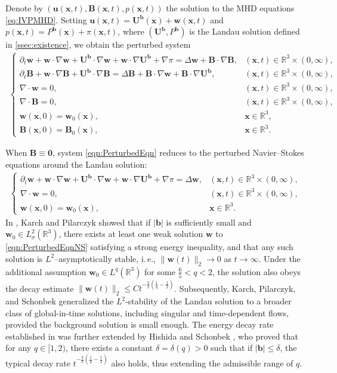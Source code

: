 \documentclass[10pt]{amsart}
\theoremstyle{plain}
\theoremstyle{definition}
\theoremstyle{remark}
\numberwithin{equation}{section}
\newcommand{\pt}{\partial_t}
\newcommand{\bx}{\boldsymbol{x}}
\newcommand{\bb}{{\boldsymbol{b}}}
\newcommand{\bu}{{\boldsymbol{u}}}
\newcommand{\bU}{{\boldsymbol{U}}}
\newcommand{\bw}{{\boldsymbol{w}}}
\newcommand{\bB}{{\boldsymbol{B}}}
\begin{document}
Denote by $(\bu(\bx,t), \bB(\bx,t), p(\bx,t))$ the solution to the MHD equations \cref{eq:IVPMHD}. Setting $\bu(\bx,t)=\bU^{\bb}(\bx)+\bw(\bx,t)$ and $p(\bx,t)=P^\bb(\bx)+\pi(\bx,t)$, where $(\bU^\bb,P^\bb)$ is the Landau solution defined in \cref{ssec:existence},  we obtain the perturbed system
\begin{align}\label{eqn:PerturbedEqn}
\begin{cases}
\pt \bw + \bw \cdot \nabla \bw + \bU^\bb\cdot \nabla\bw+\bw\cdot \nabla \bU^\bb+\nabla \pi = \Delta\bw + \bB \cdot \nabla \bB, & (\bx,t)\in \mathbb{R}^3\times(0,\infty),\\
\pt \bB+\bw \cdot \nabla \bB+ \bU^\bb \cdot \nabla \bB=\Delta \bB + \bB \cdot \nabla \bw + \bB\cdot \nabla \bU^\bb, & (\bx,t)\in \mathbb{R}^3\times(0,\infty),\\
\nabla \cdot \bw=0, & (\bx,t)\in \mathbb{R}^3\times(0,\infty),\\
\nabla \cdot \bB=0, & (\bx,t)\in \mathbb{R}^3\times(0,\infty),\\
\bw(\bx,0)=\bw_0(\bx), & \bx \in \mathbb{R}^3,\\
\bB(\bx,0)=\bB_0(\bx), & \bx \in \mathbb{R}^3.
\end{cases}
\end{align}

When $\bB \equiv \mathbf{0}$, system \cref{eqn:PerturbedEqn} reduces to the perturbed Navier--Stokes equations around the Landau solution:
\begin{align}\label{eqn:PerturbedEqnNS}
\begin{cases}
\partial_t \bw + \bw \cdot \nabla \bw + \bU^\bb \cdot \nabla \bw + \bw \cdot \nabla \bU^\bb + \nabla \pi = \Delta \bw, & (\bx,t) \in \mathbb{R}^3 \times (0,\infty), \\
\nabla \cdot \bw = 0, & (\bx,t) \in \mathbb{R}^3 \times (0,\infty), \\
\bw(\bx,0) = \bw_0(\bx), & \bx \in \mathbb{R}^3.
\end{cases}
\end{align} 
In \cite{KarchPilarczyk2011}, Karch and Pilarczyk showed that if $|\bb|$ is sufficiently small and $\bw_0 \in L^2_\sigma(\mathbb{R}^3)$, there exists at least one weak solution $\bw$ to \eqref{eqn:PerturbedEqnNS} satisfying a strong energy inequality, and that any such solution is $L^2$--asymptotically stable, i.\,e., $\|\bw(t)\|_2 \to 0$ as $t \to \infty$. Under the additional assumption $\bw_0 \in L^q(\mathbb{R}^3)$ for some $\frac{6}{5} < q < 2$, the solution also obeys the decay estimate $\|\bw(t)\|_2 \leq C t^{-\frac{3}{2}(\frac{1}{q} - \frac{1}{2})}$. 
Subsequently, Karch, Pilarczyk, and Schonbek \cite{KarchPilarczykSchonbek17} generalized the $L^2$-stability of the Landau solution to a broader class of global-in-time solutions, including singular and time-dependent flows, provided the background solution is small enough.
The energy decay rate established in \cite{KarchPilarczyk2011} was further extended by Hishida and Schonbek \cite{HishidaSchonbek16}, who proved that for any $q\in [1,2)$, there exists a constant $\delta=\delta(q)>0$ such that if $|\bb|\le \delta$, the typical decay rate $t^{-\frac{3}{2}(\frac{1}{q}-\frac{1}{2})}$ also holds, thus extending the admissible range of $q$. 
\end{document}
